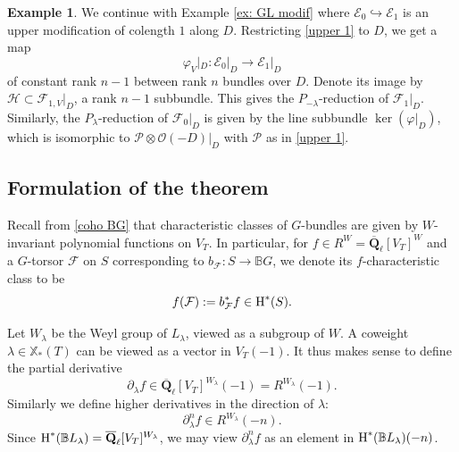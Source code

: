 \documentclass[reqno]{amsart}
\numberwithin{equation}{subsection}
\theoremstyle{definition}
\newtheorem{exam}[subsubsection]{Example}
\def\BB{\mathbb{B}}
\newcommand\cE{\mathcal{E}}
\newcommand\cF{\mathcal{F}}
\newcommand\cH{\mathcal{H}}
\newcommand\cO{\mathcal{O}}
\newcommand\cP{\mathcal{P}}
\newcommand\xcoch{\mathbb{X}_*}
\newcommand{\Qlbar}{\overline{\Q}_\ell}
\newcommand\ot{\otimes}
\newcommand{\cohog}[2]{\textup{H}^{#1}({#2})}     %
\newcommand{\incl}{\hookrightarrow}
\newcommand{\ph}{\varphi}
\renewcommand{\l}{\lambda}
\newcommand\pl{\partial}
\newcommand{\Q}{\mathbf{Q}}
\begin{document}
\begin{exam}\label{ex: GL par red}
We continue with Example \ref{ex: GL modif} where $\cE_0\incl \cE_1$ is an upper modification of colength $1$ along $D$. Restricting \eqref{upper 1} to $D$, we get a map 
\begin{equation*}
\ph_V|_{D}: \cE_{0}|_{D}\to \cE_{1}|_{D}
\end{equation*}
of constant rank $n-1$ between rank $n$ bundles over $D$. Denote its image by $\cH\subset \cF_{1,V}|_{D}$, a rank $n-1$ subbundle. This gives the $P_{-\l}$-reduction of $\cF_{1}|_{D}$. Similarly, the $P_{\l}$-reduction of $\cF_{0}|_{D}$ is given by the line subbundle $\ker(\ph|_{D})$, which is isomorphic to $\cP\ot \cO(-D)|_D$ with $\cP$ as in \eqref{upper 1}.
\end{exam}


\subsection{Formulation of the theorem}
Recall from \eqref{coho BG} that characteristic classes of $G$-bundles are given by $W$-invariant polynomial functions on $V_{T}$.  In particular, for $f\in R^{W}=\Qlbar[V_{T}]^{W}$ and a $G$-torsor $\cF$ on $S$ corresponding to $b_{\cF}: S\to \BB G$, we denote its $f$-characteristic class to be
\begin{equation*}
f(\cF):=b_{\cF}^{*}f\in \cohog{*}{S}.
\end{equation*}


Let $W_{\lambda}$ be the Weyl group of $L_\lambda$, viewed as a subgroup of $W$.  A coweight $\l\in \xcoch(T)$ can be viewed as a vector in $V_{T}(-1)$. It thus makes sense to define the partial derivative
\begin{equation*}
\pl_{\l}f\in \Qlbar[V_{T}]^{W_{\lambda}}(-1)=R^{W_{\lambda}}(-1).
\end{equation*}
Similarly we define higher derivatives in the direction of $\l$:
\begin{equation*}
\pl^{n}_{\l}f\in R^{W_{\lambda}}(-n).
\end{equation*}
Since $\cohog{*}{\BB L_{\l}}=\Qlbar[V_{T}]^{W_{\lambda}}$, we may view $\pl^{n}_{\l}f$ as an element in $\cohog{*}{\BB L_{\l}}(-n)$.
\end{document}
